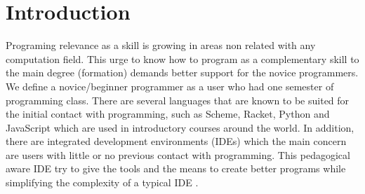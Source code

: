 \section{Introduction}




Programing relevance as a skill is growing in areas non related with any computation field.  %
This urge to know how to program as a complementary skill %
to the main degree (formation) demands better support for the novice programmers.
We define a novice/beginner programmer as a user who had one semester of programming class. %
There are several languages that are known to be suited for the initial contact %
with programming, such as Scheme, Racket, Python and JavaScript which are used in introductory
courses around the world.
In addition, there are integrated development environments (IDEs) which the main
concern are users with little or no previous contact with programming\cite{kolling2003bluej}. %
This pedagogical %
aware IDE try to give the tools and the means to create better programs while simplifying
the complexity of a typical IDE \cite{pears2007survey}.%

